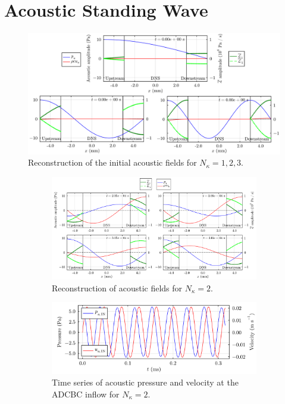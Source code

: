 \section{Acoustic Standing Wave}

\begin{figure}[t]
\centering
\includegraphics[scale=0.35]{assets/graphs/ac-plot-wave-modes.pdf}
\caption{Reconstruction of the initial acoustic fields for $N_κ = 1, 2, 3$.}
\label{fig:ac-wave-modes}
\end{figure}

\begin{figure}[t]
\centering
\begin{subfigure}{0.99\textwidth}
\centering
\includegraphics[scale=0.33]{assets/graphs/ac-plot-3-4_long.pdf}
\caption{Reconstruction of acoustic fields for $N_κ = 2$.}
\label{fig:ac-wave-later}
\end{subfigure}

\vspace*{0.5em}

\begin{subfigure}{0.99\textwidth}
\centering
\includegraphics[scale=0.35]{assets/graphs/up_plot_wave.pdf}
\caption{Time series of acoustic pressure and velocity at the ADCBC inflow for $N_κ = 2$.}
\label{fig:up_plot_wave}
\end{subfigure}
\caption{}
\label{fig:wave-later}
\end{figure}

